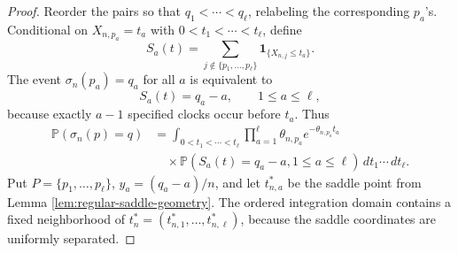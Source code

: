 \documentclass[11pt]{article}
\theoremstyle{remark}
\newcommand{\Pp}{\mathbb P}
\newcommand{\one}{\mathbf 1}
\newcommand{\dd}{\,d}
\begin{document}
\begin{proof}
Reorder the pairs so that \(q_1<\cdots<q_\ell\), relabeling the corresponding \(p_a\)'s.  Conditional on \(X_{n,p_a}=t_a\) with \(0<t_1<\cdots<t_\ell\), define
\[
        S_a(t)=\sum_{j\notin\{p_1,\ldots,p_\ell\}}\one_{\{X_{n,j}\le t_a\}}.
\]
The event \(\sigma_n(p_a)=q_a\) for all \(a\) is equivalent to
\[
        S_a(t)=q_a-a,
        \qquad 1\le a\le\ell,
\]
because exactly \(a-1\) specified clocks occur before \(t_a\).  Thus
\[
\begin{aligned}
\Pp(\sigma_n(p)=q)
  &=\int_{0<t_1<\cdots<t_\ell}
     \prod_{a=1}^\ell\theta_{n,p_a}e^{-\theta_{n,p_a}t_a}  \\
  &\quad\times
     \Pp(S_a(t)=q_a-a,1\le a\le\ell)\dd t_1\cdots\dd t_\ell .
\end{aligned}
\]
Put \(P=\{p_1,\ldots,p_\ell\}\), \(y_a=(q_a-a)/n\), and let \(t_{n,a}^*\) be the saddle point from Lemma \ref{lem:regular-saddle-geometry}.  The ordered integration domain contains a fixed neighborhood of \(t_n^*=(t_{n,1}^*,\ldots,t_{n,\ell}^*)\), because the saddle coordinates are uniformly separated.


\end{proof}
\end{document}
